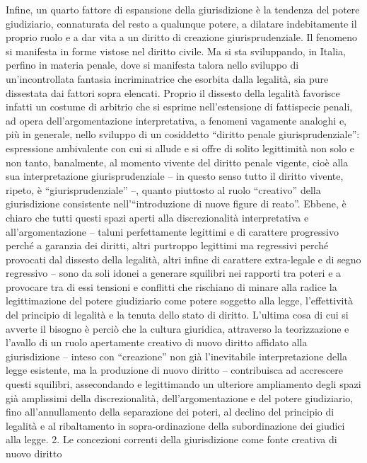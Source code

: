Infine, un quarto fattore di espansione della giurisdizione è la tendenza del potere giudiziario, connaturata del resto a qualunque potere, a dilatare indebitamente il proprio ruolo e a dar vita a un diritto di creazione giurisprudenziale. Il fenomeno si manifesta in forme vistose nel diritto civile. Ma si sta sviluppando, in Italia, perfino in materia penale, dove si manifesta talora nello sviluppo di un’incontrollata fantasia incriminatrice che esorbita dalla legalità, sia pure dissestata dai fattori sopra elencati. Proprio il dissesto della legalità favorisce infatti un costume di arbitrio che si esprime nell’estensione di fattispecie penali, ad opera dell’argomentazione interpretativa, a fenomeni vagamente analoghi e, più in generale, nello sviluppo di un cosiddetto “diritto penale giurisprudenziale”: espressione ambivalente con cui si allude e si offre di solito legittimità non solo e non tanto, banalmente, al momento vivente del diritto penale vigente, cioè alla sua interpretazione giurisprudenziale – in questo senso tutto il diritto vivente, ripeto, è “giurisprudenziale” –, quanto piuttosto al ruolo “creativo” della giurisdizione consistente nell’“introduzione di nuove figure di reato”.
Ebbene, è chiaro che tutti questi spazi aperti alla discrezionalità interpretativa e all’argomentazione – taluni perfettamente legittimi e di carattere progressivo perché a garanzia dei diritti, altri purtroppo legittimi ma regressivi perché provocati dal dissesto della legalità, altri infine di carattere extra-legale e di segno regressivo – sono da soli idonei a generare squilibri nei rapporti tra poteri e a provocare tra di essi tensioni e conflitti che rischiano di minare alla radice la legittimazione del potere giudiziario come potere soggetto alla legge, l’effettività del principio di legalità e la tenuta dello stato di diritto. L’ultima cosa di cui si avverte il bisogno è perciò che la cultura giuridica, attraverso la teorizzazione e l’avallo di un ruolo apertamente creativo di nuovo diritto affidato alla giurisdizione – inteso con “creazione” non già l’inevitabile interpretazione della legge esistente, ma la produzione di nuovo diritto – contribuisca ad accrescere questi squilibri, assecondando e legittimando un ulteriore ampliamento degli spazi già amplissimi della discrezionalità, dell’argomentazione e del potere giudiziario, fino all’annullamento della separazione dei poteri, al declino del principio di legalità e al ribaltamento in sopra-ordinazione della subordinazione dei giudici alla legge.
2. Le concezioni correnti della giurisdizione come fonte creativa di nuovo diritto
